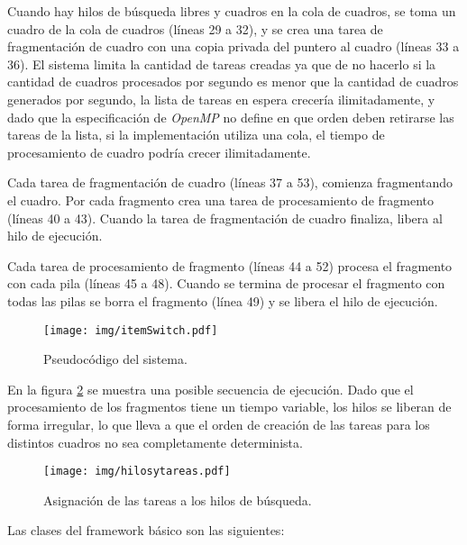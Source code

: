 Cuando hay hilos de búsqueda libres y cuadros en la cola de cuadros, se toma un
cuadro de la cola de cuadros (líneas 29 a 32), y se crea una tarea de
fragmentación de cuadro con una copia privada del puntero al cuadro (líneas 33 a
36). El sistema limita la cantidad de tareas creadas ya que de no hacerlo si la
cantidad de cuadros procesados por segundo es menor que la cantidad de cuadros
generados por segundo, la lista de tareas en espera crecería ilimitadamente, y
dado que la especificación de \emph{OpenMP} no define en que orden deben
retirarse las tareas de la lista, si la implementación utiliza una cola, el
tiempo de procesamiento de cuadro podría crecer ilimitadamente.

Cada tarea de fragmentación de cuadro (líneas 37 a 53), comienza fragmentando el
cuadro. Por cada fragmento crea una tarea de procesamiento de fragmento (líneas
40 a 43). Cuando la tarea de fragmentación de cuadro finaliza, libera al hilo de
ejecución.

Cada tarea de procesamiento de fragmento (líneas 44 a 52) procesa el fragmento
con cada pila (líneas 45 a 48). Cuando se termina de procesar el fragmento con
todas las pilas se borra el fragmento (línea 49) y se libera el hilo de
ejecución.

\begin{figure}[!htb]

	\centering

	\texttt{[image: img/itemSwitch.pdf]}

	\caption{Pseudocódigo del sistema.}

	\label{codigo}

\end{figure}

En la figura \ref{hilosytareas} se muestra una posible secuencia de ejecución.
Dado que el procesamiento de los fragmentos tiene un tiempo variable, los hilos
se liberan de forma irregular, lo que lleva a que el orden de creación de las
tareas para los distintos cuadros no sea completamente determinista.

\begin{figure}[!htb]

	\texttt{[image: img/hilosytareas.pdf]}

	\caption{Asignación de las tareas a los hilos de búsqueda.}

	\label{hilosytareas}

\end{figure}

Las clases del framework básico son las siguientes:

